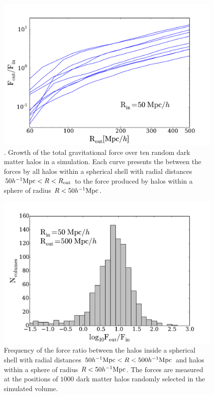 \documentclass{article}
\newcommand{\hMpc}{{\ifmmode{h^{-1}{\rm Mpc}}\else{$h^{-1}$Mpc }\fi}}
\begin{document}
\begin{figure}
\begin{center}
\includegraphics[width=0.8\linewidth,angle=0]{spheres_nbody_radius_200_1000.pdf}
\caption{\label{fig:spheres_radius}. Growth of the total gravitational
  force over ten random dark matter halos in a simulation. Each curve
  presents the between the forces by all halos within a spherical shell with
   radial distances $50\hMpc < R < R_{\rm out}$ to the force produced
   by halos within a sphere of radius $R<50\hMpc$. }  
\end{center}
\end{figure}



\begin{figure}
\begin{center}
\includegraphics[width=0.8\linewidth,angle=0]{spheres_nbody_200_1000.pdf}
\caption{\label{fig:spheres_nbody} Frequency of the force ratio between
  the halos inside a spherical shell with radial distances $50\hMpc <
  R < 500\hMpc$ and halos within a sphere of radius $R<50\hMpc$. The forces
  are measured at the positions of $1000$ dark matter halos randomly
  selected in the simulated volume.}
\end{center}
\end{figure}




 
\end{document}
